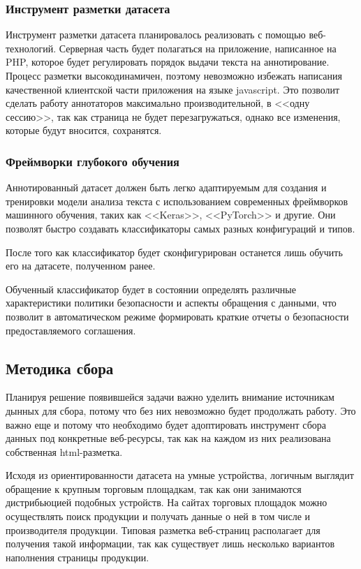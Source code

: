 \documentclass[../main]{subfiles}
\begin{document}
\subsubsection{Инструмент разметки датасета}
Инструмент разметки датасета планировалось реализовать с помощью веб-технологий. Серверная часть будет полагаться на приложение, написанное на PHP, которое будет регулировать порядок выдачи текста на аннотирование. Процесс разметки высокодинамичен, поэтому невозможно избежать написания качественной клиентской части приложения на языке javascript. Это позволит сделать работу аннотаторов максимально производительной, в <<одну сессию>>, так как страница не будет перезагружаться, однако все изменения, которые будут вносится, сохранятся.

\subsubsection{Фреймворки глубокого обучения}
Аннотированный датасет должен быть легко адаптируемым для создания и тренировки модели анализа текста с использованием современных фреймворков машинного обучения, таких как <<Keras>>, <<PyTorch>> и другие. Они позволят быстро создавать классификаторы самых разных конфигураций и типов.

После того как классификатор будет сконфигурирован останется лишь обучить его на датасете, полученном ранее.

Обученный классификатор будет в состоянии определять различные характеристики политики безопасности и аспекты обращения с данными, что позволит в автоматическом режиме формировать краткие отчеты о безопасности предоставляемого соглашения.

\subsection{Методика сбора}
Планируя решение появившейся задачи важно уделить внимание источникам дынных для сбора, потому что без них невозможно будет продолжать работу. Это важно еще и потому что необходимо будет адоптировать инструмент сбора данных под конкретные веб-ресурсы, так как на каждом из них реализована собственная html-разметка.

Исходя из ориентированности датасета на умные устройства, логичным выглядит обращение к крупным торговым площадкам, так как они занимаются дистрибьюцией подобных устройств. На сайтах торговых площадок можно осуществлять поиск продукции и получать данные о ней в том числе и производителя продукции. Типовая разметка веб-страниц располагает для получения такой информации, так как существует лишь несколько вариантов наполнения страницы продукции.
\end{document}
